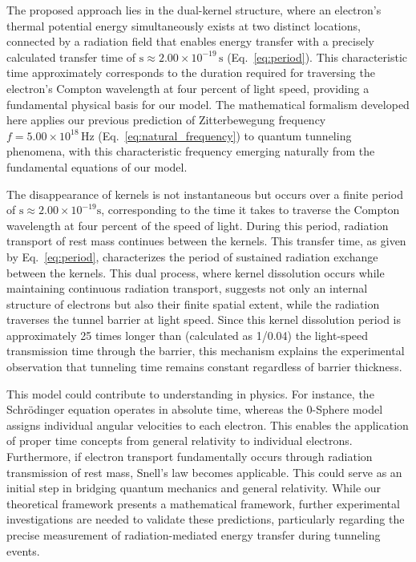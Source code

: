 \documentclass[%
 reprint,
 amsmath,amssymb,
 aps,
]{revtex4-1}
\numberwithin{equation}{section}%
\begin{document}
The proposed approach lies in the dual-kernel structure, where an electron's thermal potential energy simultaneously exists at two distinct locations, connected by a radiation field that enables energy transfer with a precisely calculated transfer time of $\mathrm{s} \approx 2.00 \times 10^{-19} \, \mathrm{s}$ (Eq.~\ref{eq:period}). This characteristic time approximately corresponds to the duration required for traversing the electron's Compton wavelength at four percent of light speed, providing a fundamental physical basis for our model. The mathematical formalism developed here applies our previous prediction of Zitterbewegung frequency $f = 5.00 \times 10^{18} \, \mathrm{Hz}$ (Eq.~\ref{eq:natural_frequency}) to quantum tunneling phenomena, with this characteristic frequency emerging naturally from the fundamental equations of our model.

The disappearance of kernels is not instantaneous but occurs over a finite period of $\mathrm{s} \approx 2.00 \times 10^{-19}  \mathrm{s}$, corresponding to the time it takes to traverse the Compton wavelength at four percent of the speed of light. During this period, radiation transport of rest mass continues between the kernels. This transfer time, as given by Eq.~\ref{eq:period}, characterizes the period of sustained radiation exchange between the kernels. This dual process, where kernel dissolution occurs while maintaining continuous radiation transport, suggests not only an internal structure of electrons but also their finite spatial extent, while the radiation traverses the tunnel barrier at light speed. Since this kernel dissolution period is approximately 25 times longer than (calculated as 1/0.04) the light-speed transmission time through the barrier, this mechanism explains the experimental observation that tunneling time remains constant regardless of barrier thickness.

This model could contribute to understanding in physics. For instance, the Schrödinger equation operates in absolute time, whereas the 0-Sphere model assigns individual angular velocities to each electron. This enables the application of proper time concepts from general relativity to individual electrons. Furthermore, if electron transport fundamentally occurs through radiation transmission of rest mass, Snell's law becomes applicable. This could serve as an initial step in bridging quantum mechanics and general relativity. While our theoretical framework presents a mathematical framework, further experimental investigations are needed to validate these predictions, particularly regarding the precise measurement of radiation-mediated energy transfer during tunneling events.
\end{document}
